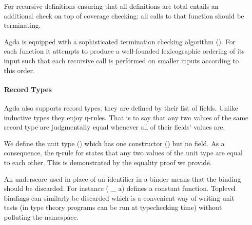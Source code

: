 \begin{minipage}{0.5\textwidth}
\end{minipage}\begin{minipage}{0.5\textwidth}
\end{minipage}

For recursive definitions ensuring that all definitions are total entails
an additional check on top of coverage checking: all calls to that function
should be terminating.

\begin{feature} Agda is equipped with a sophisticated
termination checking algorithm (\cite{abel1998foetus}). For each function it
attempts to produce a well-founded lexicographic ordering of its input such
that each recursive call is performed on smaller inputs according to this
order.
\end{feature}

\paragraph{Record Types}\label{par:recordtypes}

Agda also supports record types; they are defined by their list of fields.
Unlike inductive types they enjoy η-rules. That is to say that any two
values of the same record type are judgmentally equal whenever all of their
fields' values are.

We define the unit type () which has one constructor () but no
field. As a consequence, the η-rule for  states that any two values of
the unit type are equal to each other. This is demonstrated by the equality
proof we provide.

\begin{minipage}[t]{0.5\textwidth}
\end{minipage}
\begin{minipage}[t]{0.5\textwidth}
\end{minipage}

\begin{feature}
An underscore used in place of an identifier in a binder means that the binding
should be discarded. For instance {( \_  a)} defines a constant function.
Toplevel bindings can similarly be discarded which is a convenient way of
writing unit tests (in type theory programs can be run at typechecking time)
without polluting the namespace.
\end{feature}

